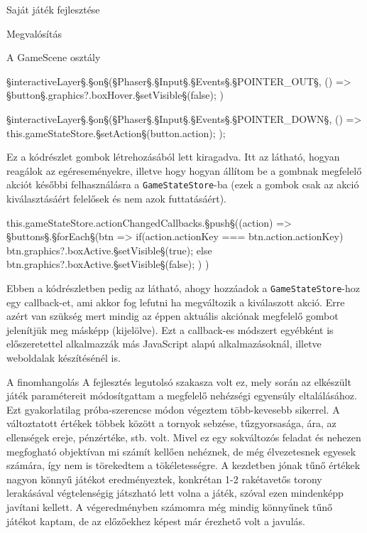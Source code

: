 \begin{MyChapter}{Saját játék fejlesztése}
\begin{MySection}{Megvalósítás}
\begin{MySubSection}{A GameScene osztály}
\begin{javascript}
{	§\color{jsConst}interactiveLayer§.§\color{jsMethod}on§(§\color{jsType}Phaser§.§\color{jsType}Input§.§\color{jsType}Events§.§\color{jsConst}POINTER\_OUT§, () => {
		§\color{jsConst}button§.graphics?.boxHover.§\color{jsMethod}setVisible§(false);
	})
	
	§\color{jsConst}interactiveLayer§.§\color{jsMethod}on§(§\color{jsType}Phaser§.§\color{jsType}Input§.§\color{jsType}Events§.§\color{jsConst}POINTER\_DOWN§, () => {
		this.gameStateStore.§\color{jsMethod}setAction§(button.action);
	});
}
			\end{javascript}
			Ez a kódrészlet gombok létrehozásából lett kiragadva. Itt az látható, hogyan reagálok az egéreseményekre, illetve hogy hogyan állítom be a gombnak megfelelő akciót későbbi felhasználásra a \texttt{GameStateStore}-ba (ezek a gombok csak az akció kiválasztásáért felelősek és nem azok futtatásáért).
			\begin{javascript}
this.gameStateStore.actionChangedCallbacks.§\color{jsMethod}push§((action) => {
	§\color{jsConst}buttons§.§\color{jsMethod}forEach§(btn => {
		if(action.actionKey === btn.action.actionKey) {
			btn.graphics?.boxActive.§\color{jsMethod}setVisible§(true);
		} else {
			btn.graphics?.boxActive.§\color{jsMethod}setVisible§(false);
		}
	})
})
			\end{javascript}
			Ebben a kódrészletben pedig az látható, ahogy hozzáadok a \texttt{GameStateStore}-hoz egy callback-et, ami akkor fog lefutni ha megváltozik a kiválaszott akció. Erre azért van szükség mert mindig az éppen aktuális akciónak megfelelő gombot jelenítjük meg másképp (kijelölve). Ezt a callback-es módszert egyébként is előszeretettel alkalmazzák más JavaScript alapú alkalmazásoknál, illetve weboldalak készítésénél is.
		\end{MySubSection}
		
		\begin{MySubSection}{A finomhangolás}
			A fejlesztés legutolsó szakasza volt ez, mely során az elkészült játék paramétereit módosítgattam a megfelelő nehézségi egyensúly eltalálásához. Ezt gyakorlatilag próba-szerencse módon végeztem több-kevesebb sikerrel. A változtatott értékek többek között a tornyok sebzése, tűzgyorsasága, ára, az ellenségek ereje, pénzértéke, stb. volt. Mivel ez egy sokváltozós feladat és nehezen megfogható objektívan mi számít kellően nehéznek, de még élvezetesnek egyesek számára, így nem is törekedtem a tökéletességre.
			A kezdetben jónak tűnő értékek nagyon könnyű játékot eredményeztek, konkrétan 1-2 rakétavetős torony lerakásával végtelenségig játszható lett volna a játék, szóval ezen mindenképp javítani kellett. A végeredményben számomra még mindig könnyűnek tűnő játékot kaptam, de az előzőekhez képest már érezhető volt a javulás.
		\end{MySubSection}
			

\end{MySection}
\end{MyChapter}
